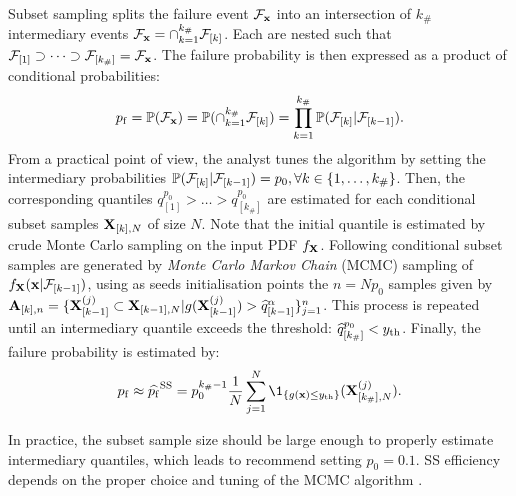 Subset sampling splits the failure event $\mathcal{F}_{{\bf x}}$ into an intersection of $k_\#$ intermediary events $\mathcal{F}_{{\bf x}} = \cap_{k=1}^{k_\#} \mathcal{F}_{[k]}$.
Each are nested such that $\mathcal{F}_{[1]} \supset \dots \supset \mathcal{F}_{[k_\#]} = \mathcal{F}_{{\bf x}}$.
The failure probability is then expressed as a product of conditional probabilities:
\begin{equation}
    p_\mathrm{f} = \mathbb{P}(\mathcal{F}_{{\bf x}}) = \mathbb{P}(\cap_{k=1}^{k_\#} \mathcal{F}_{[k]}) = \prod_{k=1}^{k_\#} \mathbb{P}(\mathcal{F}_{[k]} | \mathcal{F}_{[k-1]}).
\end{equation}
From a practical point of view, the analyst tunes the algorithm by setting the intermediary probabilities $\mathbb{P}(\mathcal{F}_{[k]} | \mathcal{F}_{[k-1]}) = p_0, \forall k \in \{1, \dots, k_\# \}$. 
Then, the corresponding quantiles $q_{[1]}^{p_0} > \dots > q_{[k_\#]}^{p_0}$ are estimated for each conditional subset samples ${\bf X}_{[k], N}$ of size $N$. 
Note that the initial quantile is estimated by crude Monte Carlo sampling on the input PDF $f_{{\bf X}}$. 
Following conditional subset samples are generated by \textit{Monte Carlo Markov Chain} (MCMC) sampling of $f_{{\bf X}}({\bf x} |\mathcal{F}_{[k-1]})$, using as seeds initialisation points the $n= N p_0$ samples given by $\mathbf{A}_{[k], n}=\{{\bf X}_{[k-1]}^{(j)} \subset {\bf X}_{[k-1], N}| g({\bf X}_{[k-1]}^{(j)}) > \widehat{q}_{[k-1]}^\alpha \}_{j=1}^n$. 
This process is repeated until an intermediary quantile exceeds the threshold: $\widehat{q}_{[k_\#]}^{p_0} < y_\mathrm{th}$. 
Finally, the failure probability is estimated by:
\begin{equation}
    \pf \approx \widehat{\pf}^{\mathrm{SS}} = p_0^{k_\# -1} \frac1N \sum_{j=1}^N \1_{\{g(\bx) \leq \yth\}} (\bX_{[k_\#],N}^{(j)}).
\end{equation}

In practice, the subset sample size should be large enough to properly estimate intermediary quantiles, which leads \cite{AuBeck2001} to recommend setting $p_0=0.1$. 
SS efficiency depends on the proper choice and tuning of the MCMC algorithm \citep{Papaioannou_PEM_2015}.



